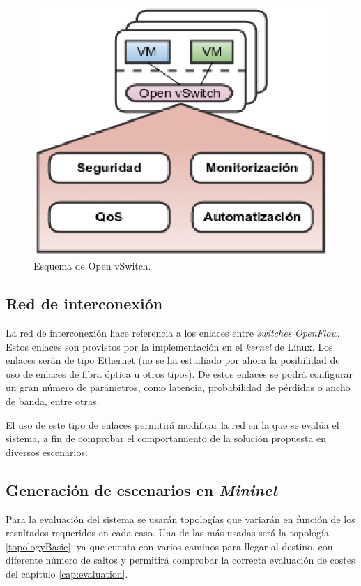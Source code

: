 \documentclass[a4paper,11pt]{book}
\begin{document}
\begin{figure}[tb]
\centering
\includegraphics[scale=0.8]{./figuras/openvswitch}
\caption{Esquema de Open vSwitch.}\label{openvswitch}
\end{figure}

\subsection{Red de interconexión}
La red de interconexión hace referencia a los enlaces entre \textit{switches} \emph{OpenFlow}. Estos enlaces son provistos por la implementación en el \textit{kernel} de Línux. Los enlaces serán de tipo Ethernet (no se ha estudiado por ahora la posibilidad de uso de enlaces de fibra óptica u otros tipos). De estos enlaces se podrá configurar un gran número de parámetros, como latencia, probabilidad de pérdidas o ancho de banda, entre otras. 

El uso de este tipo de enlaces permitirá modificar la red en la que se evalúa el sistema, a fin de comprobar el comportamiento de la solución propuesta en diversos escenarios.

\subsection{Generación de escenarios en \emph{Mininet}}\label{sub:escenariosmininet}

Para la evaluación del sistema se usarán topologías que variarán en función de los resultados requeridos en cada caso. Una de las más usadas será la topología \ref{topologyBasic}, ya que cuenta con varios caminos para llegar al destino, con diferente número de saltos y permitirá comprobar la correcta evaluación de costes del capítulo \ref{cap:evaluation}.
\end{document}
